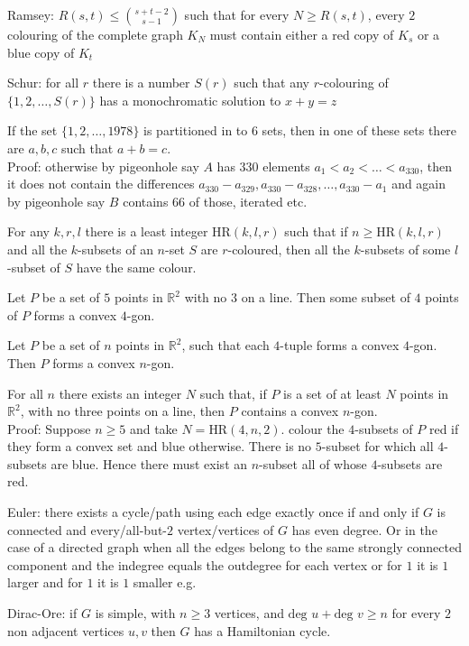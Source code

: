 Ramsey: $R(s,t) \le \binom{s+t-2}{s-1}$ such that for every $N \ge R(s,t)$, every $2$ colouring of the complete graph $K_N$ must contain either a red copy of $K_s$ or a blue copy of $K_t$

Schur: for all $r$ there is a number $S(r)$ such that any $r$-colouring of $\{1,2,\dots,S(r) \}$ has a monochromatic solution to $x+y=z$

If the set $\{1,2,\dots,1978\}$ is partitioned in to $6$ sets, then in one of these sets there are $a,b,c$ such that $a+b=c$. \\
Proof: otherwise by pigeonhole say $A$ has $330$ elements $a_1 < a_2 < \dots < a_{330}$, then it does not contain the differences $a_{330}-a_{329},a_{330}-a_{328},\dots,a_{330}-a_1$ and again by pigeonhole say $B$ contains $66$ of those, iterated etc.

For any $k,r,l$ there is a least integer $\text{HR}(k,l,r)$ such that if $n \ge \text{HR}(k,l,r)$ and all the $k$-subsets of an $n$-set $S$ are $r$-coloured, then all the $k$-subsets of some $l$-subset of $S$ have the same colour.

Let $P$ be a set of $5$ points in $\mathbb{R}^2$ with no $3$ on a line. Then some subset of $4$ points of $P$ forms a convex $4$-gon.

Let $P$ be a set of $n$ points in $\mathbb{R}^2$, such that each $4$-tuple forms a convex $4$-gon. Then $P$ forms a convex $n$-gon.

For all $n$ there exists an integer $N$ such that, if $P$ is a set of at least $N$ points in $\mathbb{R}^2$, with no three points on a line, then $P$ contains a convex $n$-gon. \\
Proof: Suppose $n \ge 5$ and take $N = \text{HR}(4,n,2)$. colour the $4$-subsets of $P$ red if they form a convex set and blue otherwise. There is no $5$-subset for which all $4$-subsets are blue. Hence there must exist an $n$-subset all of whose $4$-subsets are red.

Euler: there exists a cycle/path using each edge exactly once if and only if $G$ is connected and every/all-but-$2$ vertex/vertices of $G$ has even degree. Or in the case of a directed graph when all the edges belong to the same strongly connected component and the indegree equals the outdegree for each vertex or for $1$ it is $1$ larger and for $1$ it is $1$ smaller e.g.

Dirac-Ore: if $G$ is simple, with $n \ge 3$ vertices, and $\text{deg }u+\text{deg }v \ge n$ for every $2$ non adjacent vertices $u,v$ then $G$ has a Hamiltonian cycle.

